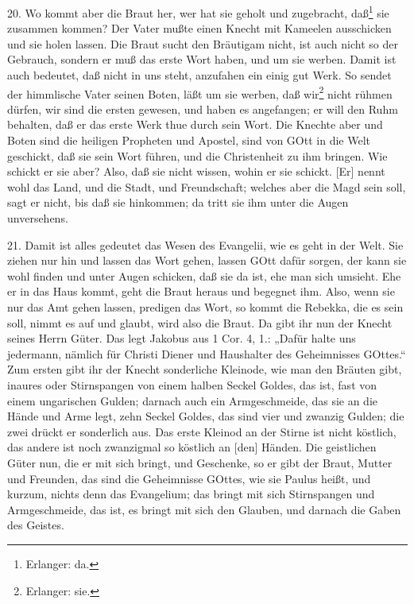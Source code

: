 20. Wo kommt aber die Braut her, wer hat sie geholt und zugebracht, daß\footnote{Erlanger: da.} sie zusammen kommen? Der Vater mußte einen Knecht mit Kameelen ausschicken und sie holen lassen. Die Braut sucht den Bräutigam nicht, ist auch nicht so der Gebrauch, sondern er muß das erste Wort haben, und um sie werben. Damit ist auch bedeutet, daß nicht in uns steht, anzufahen ein einig gut Werk. So sendet der himmlische Vater seinen Boten, läßt um sie werben, daß wir\footnote{Erlanger: sie.} nicht rühmen dürfen, wir sind die ersten gewesen, und haben es angefangen; er will den Ruhm behalten, daß er das erste Werk thue durch sein Wort. Die Knechte aber und Boten sind die heiligen Propheten und Apostel, sind von GOtt in die Welt geschickt, daß sie sein Wort führen, und die Christenheit zu ihm bringen. Wie schickt er sie aber? Also, daß sie nicht wissen, wohin er sie schickt. [Er] nennt wohl das Land, und die Stadt, und Freundschaft; welches aber die Magd sein soll, sagt er nicht, bis daß sie hinkommen; da tritt sie ihm unter die Augen unversehens.

21. Damit ist alles gedeutet das Wesen des Evangelii, wie es geht in der Welt. Sie ziehen nur hin und lassen das Wort gehen, lassen GOtt dafür sorgen, der kann sie wohl finden und unter Augen schicken, daß sie da ist, ehe man sich umsieht. Ehe er in das Haus kommt, geht die Braut heraus und begegnet ihm. Also, wenn sie nur das Amt gehen lassen, predigen das Wort, so kommt die Rebekka, die es sein soll, nimmt es auf und glaubt, wird also die Braut. Da gibt ihr nun der Knecht seines Herrn Güter. Das legt Jakobus aus 1 Cor. 4, 1.: „Dafür halte uns jedermann, nämlich für Christi Diener und Haushalter des Geheimnisses GOttes.“ Zum ersten gibt ihr der Knecht sonderliche Kleinode, wie man den Bräuten gibt, inaures oder Stirnspangen von einem halben Seckel Goldes, das ist, fast von einem ungarischen Gulden; darnach auch ein Armgeschmeide, das sie an die Hände und Arme legt, zehn Seckel Goldes, das sind vier und zwanzig Gulden; die zwei drückt er sonderlich aus. Das erste Kleinod an der Stirne ist nicht köstlich, das andere ist noch zwanzigmal so köstlich an [den] Händen. Die geistlichen Güter nun, die er mit sich bringt, und Geschenke, so er gibt der Braut, Mutter und Freunden, das sind die Geheimnisse GOttes, wie sie Paulus heißt, und kurzum, nichts denn das Evangelium; das bringt mit sich Stirnspangen und Armgeschmeide, das ist, es bringt mit sich den Glauben, und darnach die Gaben des Geistes.

